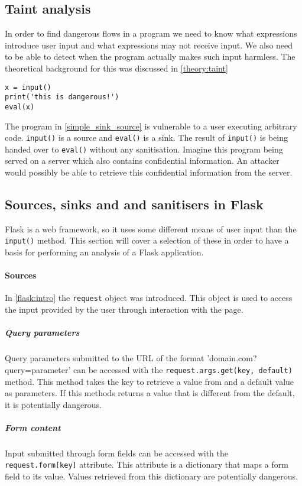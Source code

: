 \subsection{Taint analysis}
In order to find dangerous flows in a program we need to know what expressions introduce user input and what expressions may not receive input.
We also need to be able to detect when the program actually makes such input harmless.
The theoretical background for this was discussed in \cref{theory:taint}

\begin{lstlisting}[style=python, caption={A simple vulnerable program}, label=simple_sink_source]
x = input()
print('this is dangerous!')
eval(x)
\end{lstlisting}

The program in \cref{simple_sink_source} is vulnerable to a user executing arbitrary code.
\texttt{input()} is a source and \texttt{eval()} is a sink.
The result of \texttt{input()} is being handed over to \texttt{eval()} without any sanitisation.
Imagine this program being served on a server which also contains confidential information.
An attacker would possibly be able to retrieve this confidential information from the server.

\subsection{Sources, sinks and and sanitisers in Flask}
Flask is a web framework, so it uses some different means of user input than the \texttt{input()} method.
This section will cover a selection of these in order to have a basis for performing an analysis of a Flask application.

\paragraph{Sources}
In \cref{flask:intro} the \texttt{request} object was introduced.
This object is used to access the input provided by the user through interaction with the page.

\subparagraph{Query parameters}
Query parameters submitted to the URL of the format 'domain.com?query=parameter' can be accessed with the \texttt{request.args.get(key, default)} method.
This method takes the key to retrieve a value from and a default value as parameters.
If this methods returns a value that is different from the default, it is potentially dangerous.

\subparagraph{Form content}
Input submitted through form fields can be accessed with the \texttt{request.form[key]} attribute.
This attribute is a dictionary that maps a form field to its value.
Values retrieved from this dictionary are potentially dangerous.

